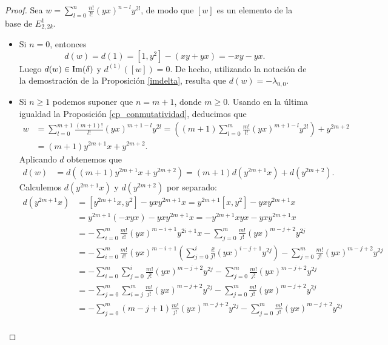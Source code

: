 \documentclass[fleqn,../tesis.tex]{subfiles}
\begin{document}
\begin{proof}
	Sea $w = \sum_{l = 0}^n \frac{n!}{l!}(yx)^{n - l}y^{2l}$, de modo que $[w]$ es un elemento de la base de $E_{2,2k}^1$.
	\begin{itemize}
		\item Si $n = 0$, entonces
			\[
				d(w) = d(1) = \left[1, y^2 \right] - (xy + yx) = -xy -yx.			
			\]
			Luego $d(w) \in \operatorname{Im}(\delta)$ y $d^{(1)}(\left[w\right]) = 0$.
			De hecho, utilizando la notación de la demostración de la Proposición \ref{imdelta}, resulta que
			$d(w) = -\lambda_{0,0}$.
		\item Si $n \geq 1$ podemos suponer que $n = m + 1$, donde $m \geq 0$. Usando en la última
		igualdad la Proposición \ref{cp_conmutatividad}, deducimos que
			\begin{align*}
				w &= \sum_{l = 0}^{m + 1} \frac{(m + 1)!}{l!}(yx)^{m + 1 - l}y^{2l}
					= \left((m + 1)\sum_{l = 0}^m\frac{m!}{l!}(yx)^{m + 1 - l}y^{2l}\right) + y^{2m + 2} \\
				&= (m + 1)y^{2m + 1}x + y^{2m + 2}.
			\end{align*}	
			Aplicando $d$ obtenemos que
			\begin{align*}
				d(w) &= d((m + 1)y^{2m + 1}x + y^{2m + 2}) = (m + 1)d(y^{2m + 1}x) + d(y^{2m + 2}).		
			\end{align*}
			Calculemos $d(y^{2m + 1}x)$ y $d(y^{2m + 2})$ por separado:
			\begin{align*}
				d(y^{2m + 1}x) &= \left[y^{2m + 1}x, y^2\right] - yxy^{2m + 1}x = y^{2m + 1}\left[x,y^2\right] - yxy^{2m + 1}x\\
				&= y^{2m + 1}(-xyx) - yxy^{2m + 1}x = -y^{2m + 1}xyx - yxy^{2m + 1}x\\
				&= -\sum_{i = 0}^m\frac{m!}{i!}(yx)^{m -i + 1}y^{2i +1}x - \sum_{j = 0}^{m}\frac{m!}{j!}(yx)^{m -j + 2}y^{2j} \\
				&= -\sum_{i = 0}^m\frac{m!}{i!}(yx)^{m -i + 1}\left(\sum_{j = 0}^{i}\frac{i!}{j!}(yx)^{i - j + 1}y^{2j}\right)
					- \sum_{j = 0}^{m}\frac{m!}{j!}(yx)^{m -j + 2}y^{2j} \\
				&= -\sum_{i = 0}^m\sum_{j = 0}^i\frac{m!}{j!}(yx)^{m -j + 2}y^{2j}
					- \sum_{j = 0}^{m}\frac{m!}{j!}(yx)^{m -j + 2}y^{2j} \\
				&= -\sum_{j = 0}^m\sum_{i = j}^m\frac{m!}{j!}(yx)^{m -j + 2}y^{2j}
					- \sum_{j = 0}^{m}\frac{m!}{j!}(yx)^{m -j + 2}y^{2j} \\
				&= -\sum_{j = 0}^m(m - j + 1)\frac{m!}{j!}(yx)^{m -j + 2}y^{2j}
					- \sum_{j = 0}^{m}\frac{m!}{j!}(yx)^{m -j + 2}y^{2j} \\

\end{align*}
\end{itemize}
\end{proof}
\end{document}

